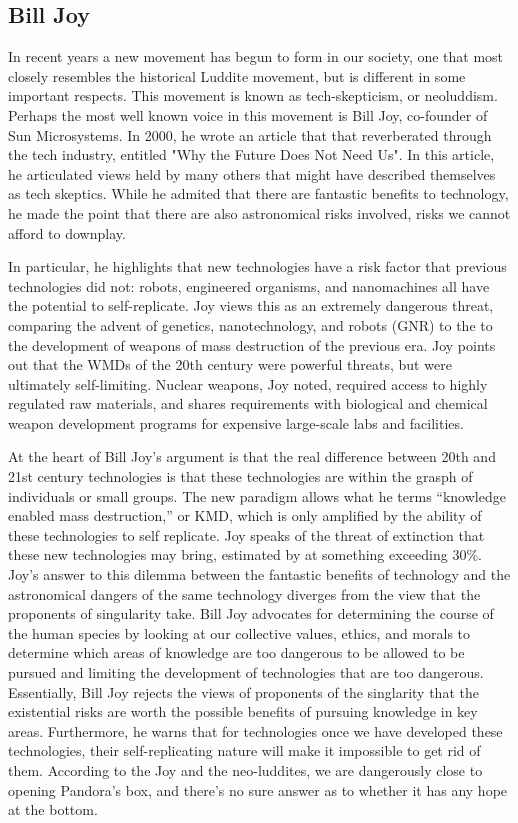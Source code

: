 \subsection{Bill Joy}
  In recent years a new movement has begun to form in our society, one 
  that most closely resembles the historical Luddite movement, but is 
  different in some important respects. This movement is known as 
  tech-skepticism, or neoluddism. Perhaps the most well known voice in 
  this movement is Bill Joy, co-founder of Sun Microsystems. In 2000, 
  he wrote an article that that reverberated through the tech industry, 
  entitled "Why the Future Does Not Need Us"\cite{joy2000future}. In this 
  article, he articulated views held by many others that might have 
  described themselves as tech skeptics. While he admited that there are 
  fantastic benefits to technology, he made the point that there are 
  also astronomical risks involved, risks we cannot afford to downplay. 

  In particular, he highlights that new technologies have a risk factor 
  that previous technologies did not: robots, engineered organisms, and 
  nanomachines all have the potential to self-replicate.  Joy views this 
  as an extremely dangerous threat, comparing the advent of genetics, 
  nanotechnology, and robots (GNR) to the to the development of weapons 
  of mass destruction of the previous era. Joy points out that the 
  WMDs of the 20th century were powerful threats, but were ultimately 
  self-limiting.  Nuclear weapons, Joy noted, required access to highly 
  regulated raw materials, and shares requirements with biological and 
  chemical weapon development programs for expensive large-scale labs and 
  facilities.  

  At the heart of Bill Joy's argument is that the real difference between 
  20th and 21st century technologies is that these technologies are 
  within the grasph of individuals or small groups. The new paradigm 
  allows what he terms ``knowledge enabled mass destruction,'' or KMD, 
  which is only amplified by the ability of these technologies to self 
  replicate. Joy speaks of the threat of extinction that these new 
  technologies may bring, estimated by at something exceeding 
  30\%\cite{joy2000future}. Joy's answer to this dilemma between the 
  fantastic benefits of technology and the astronomical dangers of 
  the same technology diverges from the view that the proponents of 
  singularity take. Bill Joy advocates for determining the course of 
  the human species by looking at our collective values, ethics, and 
  morals to determine which areas of knowledge are too dangerous to be 
  allowed to be pursued and limiting the development of technologies 
  that are too dangerous. Essentially, Bill Joy rejects the views of 
  proponents of the singlarity that the existential risks are worth 
  the possible benefits of pursuing knowledge in key areas. Furthermore, 
  he warns that for technologies once we have developed these technologies, 
  their self-replicating nature will make it impossible to get rid of 
  them.  According to the Joy and the neo-luddites, we are dangerously close to 
  opening Pandora's box, and there's no sure answer as to whether it 
  has any hope at the bottom.


\label{sec:-bill}


